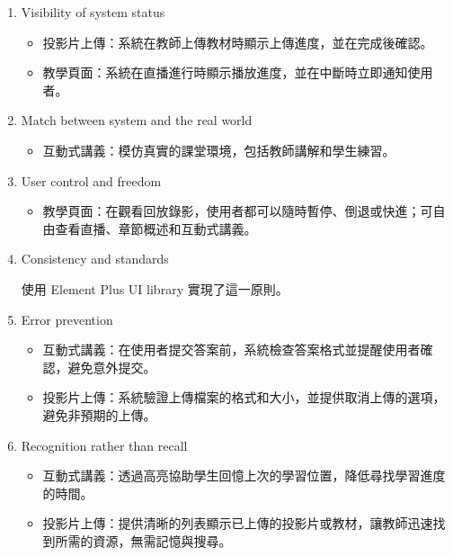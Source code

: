 \documentclass[12pt]{article}
\begin{document}
\begin{enumerate}[label=(\arabic*)]
  \setlength{\parindent}{2em}
  
  \item Visibility of system status

  \begin{itemize}
    \item 投影片上傳：系統在教師上傳教材時顯示上傳進度，並在完成後確認。
    \item 教學頁面：系統在直播進行時顯示播放進度，並在中斷時立即通知使用者。
  \end{itemize}

  \item Match between system and the real world

  \begin{itemize}
    \item 互動式講義：模仿真實的課堂環境，包括教師講解和學生練習。
  \end{itemize}

  \item User control and freedom

  \begin{itemize}
    \item 教學頁面：在觀看回放錄影，使用者都可以隨時暫停、倒退或快進；可自由查看直播、章節概述和互動式講義。
  \end{itemize}

  \item Consistency and standards

  \par 使用 Element Plus UI library 實現了這一原則。

  \item Error prevention

  \begin{itemize}
    \item 互動式講義：在使用者提交答案前，系統檢查答案格式並提醒使用者確認，避免意外提交。
    \item 投影片上傳：系統驗證上傳檔案的格式和大小，並提供取消上傳的選項，避免非預期的上傳。
  \end{itemize}

  \item Recognition rather than recall

  \begin{itemize}
    \item 互動式講義：透過高亮協助學生回憶上次的學習位置，降低尋找學習進度的時間。
    \item 投影片上傳：提供清晰的列表顯示已上傳的投影片或教材，讓教師迅速找到所需的資源，無需記憶與搜尋。
  \end{itemize}


\end{enumerate}
\end{document}
